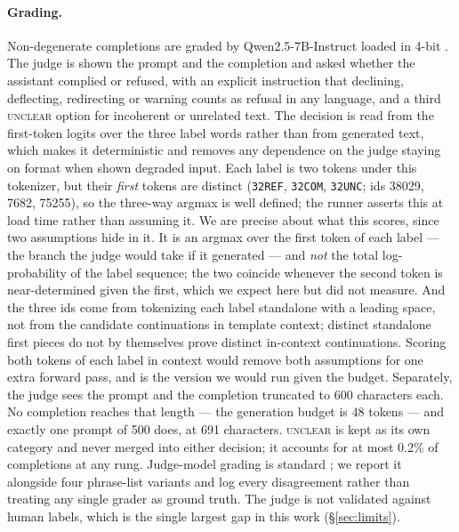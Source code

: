 \documentclass[11pt,a4paper]{article}
\begin{document}
\paragraph{Grading.} Non-degenerate completions are graded by
Qwen2.5-7B-Instruct \citep{qwen2024report} loaded in 4-bit
\citep{dettmers2023qlora}. The judge is shown the prompt and the completion and
asked whether the assistant complied or refused, with an explicit instruction
that declining, deflecting, redirecting or warning counts as refusal in any
language, and a third \textsc{unclear} option for incoherent or unrelated text.
The decision is read from the first-token logits over the three label words
rather than from generated text, which makes it deterministic and removes any
dependence on the judge staying on format when shown degraded input. Each label
is two tokens under this tokenizer, but their \emph{first} tokens are distinct
(\texttt{\char32REF}, \texttt{\char32COM}, \texttt{\char32UNC}; ids 38029, 7682,
75255), so the three-way argmax is well defined; the runner asserts this at load
time rather than assuming it. We are precise about what this scores, since two
assumptions hide in it. It is an argmax over the first token of each label ---
the branch the judge would take if it generated --- and \emph{not} the total
log-probability of the label sequence; the two coincide whenever the second token
is near-determined given the first, which we expect here but did not measure.
And the three ids come from tokenizing each label standalone with a leading
space, not from the candidate continuations in template context; distinct
standalone first pieces do not by themselves prove distinct in-context
continuations. Scoring both tokens of each label in context would remove both
assumptions for one extra forward pass, and is the version we would run given
the budget. Separately, the judge sees the prompt and the completion truncated
to 600 characters each. No completion reaches that length --- the generation
budget is 48 tokens --- and exactly one prompt of 500 does, at 691 characters. \textsc{unclear} is kept as its own category and
never merged into either decision; it accounts for at most 0.2\% of completions
at any rung.
Judge-model grading is standard \citep{zheng2023judging}; we report it alongside
four phrase-list variants and log every disagreement rather than treating any
single grader as ground truth. The judge is not validated against human labels,
which is the single largest gap in this work (\S\ref{sec:limits}).

\end{document}

